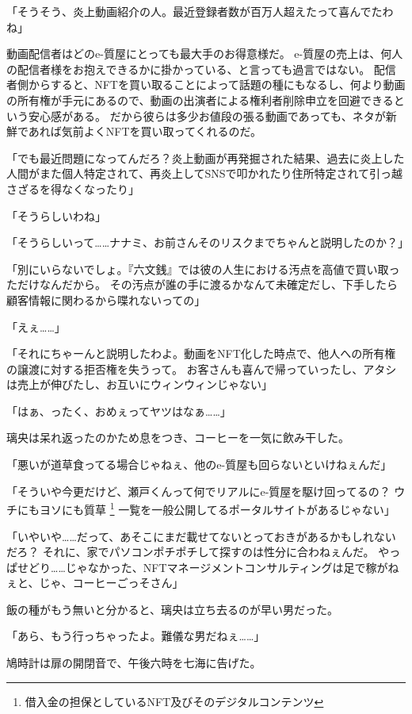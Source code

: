 「そうそう、炎上動画紹介の人。最近登録者数が百万人超えたって喜んでたわね」

動画配信者はどのe-質屋にとっても最大手のお得意様だ。
e-質屋の売上は、何人の配信者様をお抱えできるかに掛かっている、と言っても過言ではない。
配信者側からすると、NFTを買い取ることによって話題の種にもなるし、何より動画の所有権が手元にあるので、動画の出演者による権利者削除申立を回避できるという安心感がある。
だから彼らは多少お値段の張る動画であっても、ネタが新鮮であれば気前よくNFTを買い取ってくれるのだ。

「でも最近問題になってんだろ？炎上動画が再発掘された結果、過去に炎上した人間がまた個人特定されて、再炎上してSNSで叩かれたり住所特定されて引っ越さざるを得なくなったり」

「そうらしいわね」

「そうらしいって……ナナミ、お前さんそのリスクまでちゃんと説明したのか？」

「別にいらないでしょ。『六文銭』では彼の人生における汚点を高値で買い取っただけなんだから。
その汚点が誰の手に渡るかなんて未確定だし、下手したら顧客情報に関わるから喋れないっての」

「えぇ……」

「それにちゃーんと説明したわよ。動画をNFT化した時点で、他人への所有権の譲渡に対する拒否権を失うって。
お客さんも喜んで帰っていったし、アタシは売上が伸びたし、お互いにウィンウィンじゃない」

「はぁ、ったく、おめぇってヤツはなぁ……」

璃央は呆れ返ったのかため息をつき、コーヒーを一気に飲み干した。

「悪いが道草食ってる場合じゃねぇ、他のe-質屋も回らないといけねぇんだ」

「そういや今更だけど、瀬戸くんって何でリアルにe-質屋を駆け回ってるの？
  ウチにもヨソにも質草
  \footnote{借入金の担保としているNFT及びそのデジタルコンテンツ}
  一覧を一般公開してるポータルサイトがあるじゃない」

「いやいや……だって、あそこにまだ載せてないとっておきがあるかもしれないだろ？
それに、家でパソコンポチポチして探すのは性分に合わねぇんだ。
やっぱせどり……じゃなかった、NFTマネージメントコンサルティングは足で稼がねぇと、じゃ、コーヒーごっそさん」

飯の種がもう無いと分かると、璃央は立ち去るのが早い男だった。

「あら、もう行っちゃったよ。難儀な男だねぇ……」

\sectionbreak

鳩時計は扉の開閉音で、午後六時を七海に告げた。

